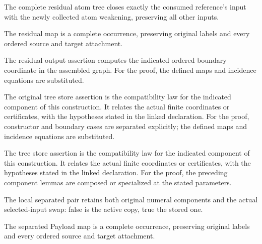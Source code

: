 The complete residual atom tree closes exactly the consumed reference's input with the newly collected atom weakening, preserving all other inputs.
\par{}

The residual map is a complete occurrence, preserving original labels and every ordered source and target attachment.
\par{}

The residual output assertion computes the indicated ordered boundary coordinate in the assembled graph.
For the proof, the defined maps and incidence equations are substituted.
\par{}

The original tree store assertion is the compatibility law for the indicated component of this construction. It relates the actual finite coordinates or certificates, with the hypotheses stated in the linked declaration.
For the proof, constructor and boundary cases are separated explicitly; the defined maps and incidence equations are substituted.
\par{}

The tree store assertion is the compatibility law for the indicated component of this construction. It relates the actual finite coordinates or certificates, with the hypotheses stated in the linked declaration.
For the proof, the preceding component lemmas are composed or specialized at the stated parameters.
\par{}

The local separated pair retains both original numeral components and the actual selected-input swap: false is the active copy, true the stored one.
\par{}

The separated Payload map is a complete occurrence, preserving original labels and every ordered source and target attachment.
\par{}

